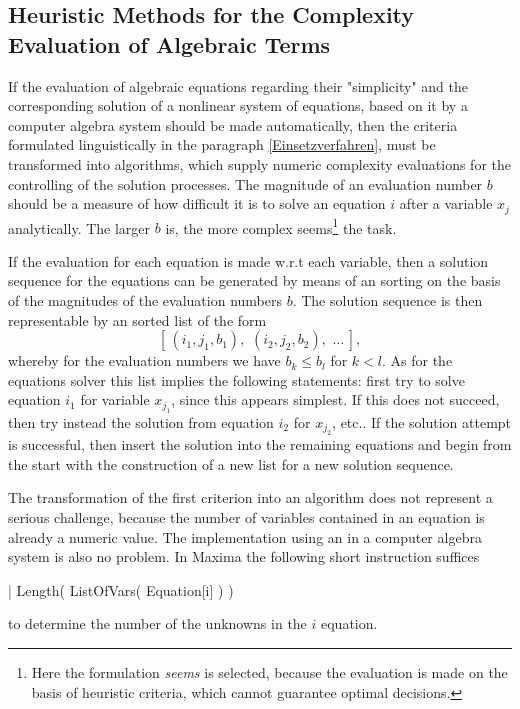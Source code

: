 \subsection[Heuristic Methods for the Complexity Evaluation of Algebraic Terms]{\label{KomplBewertung}Heuristic Methods for the Complexity Evaluation of Algebraic Terms}

If the evaluation of algebraic equations regarding their "simplicity" and the corresponding solution of a nonlinear system of equations, based on it by a computer algebra system should be made automatically, then the criteria  formulated linguistically in the paragraph \ref{Einsetzverfahren}, must be transformed into algorithms, which supply numeric complexity evaluations for the controlling of the solution processes. The magnitude of an evaluation number $b$ should be a measure of how difficult it is to solve an equation $i$  after a variable $x_j$ analytically. The larger $b$ is, the more complex seems\footnote{
Here the formulation  {\em seems} is selected, because  the evaluation is made on the basis of heuristic criteria, which cannot guarantee optimal decisions.} the task.

If the evaluation for each equation is made w.r.t  each variable, then a solution sequence for the equations can be generated by means of an sorting on the basis of the magnitudes of the evaluation numbers $b$. The solution sequence is then representable by an sorted list of the form 
\begin{displaymath}
\left[ \, (i_1, j_1, b_1), \,\, (i_2, j_2, b_2), \,\, \ldots \, \right],
\end{displaymath}
whereby for the evaluation numbers we have $b_k \leq b_l$ for $k < l$.  As for  the equations solver this list  implies  the following statements:  first try to solve  equation $i_1$ for variable $x_{j_1}$, since this appears simplest.
 If this does not succeed, then try instead the solution from equation $i_2$ for $x_{j_2}$, etc.. If the solution attempt is successful, then insert the solution into the remaining equations and begin from the start with the construction of a new list for a new solution sequence.
 
 The transformation of the first criterion into an algorithm does not represent a serious challenge, because the number of variables contained in an equation is already a numeric value. The implementation using an  in a computer algebra system is also no problem. In Maxima the following short instruction suffices 
\begin{literatim}{|}
     Length( ListOfVars( Equation[i] ) )
\end{literatim}
to determine the number of the unknowns in the $i$ equation.


